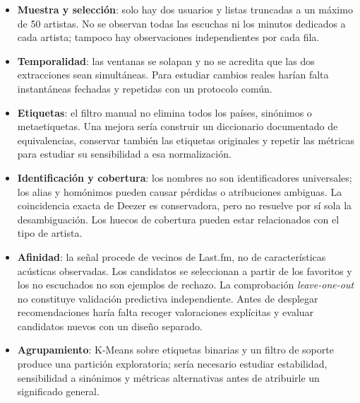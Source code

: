 \begin{itemize}
    \item \textbf{Muestra y selección}: solo hay dos usuarios y listas truncadas a un máximo de 50 artistas. No se observan todas las escuchas ni los minutos dedicados a cada artista; tampoco hay observaciones independientes por cada fila.
    \item \textbf{Temporalidad}: las ventanas se solapan y no se acredita que las dos extracciones sean simultáneas. Para estudiar cambios reales harían falta instantáneas fechadas y repetidas con un protocolo común.
    \item \textbf{Etiquetas}: el filtro manual no elimina todos los países, sinónimos o metaetiquetas. Una mejora sería construir un diccionario documentado de equivalencias, conservar también las etiquetas originales y repetir las métricas para estudiar su sensibilidad a esa normalización.
    \item \textbf{Identificación y cobertura}: los nombres no son identificadores universales; los alias y homónimos pueden causar pérdidas o atribuciones ambiguas. La coincidencia exacta de Deezer es conservadora, pero no resuelve por sí sola la desambiguación. Los huecos de cobertura pueden estar relacionados con el tipo de artista.
    \item \textbf{Afinidad}: la señal procede de vecinos de Last.fm, no de características acústicas observadas. Los candidatos se seleccionan a partir de los favoritos y los no escuchados no son ejemplos de rechazo. La comprobación \emph{leave-one-out} no constituye validación predictiva independiente. Antes de desplegar recomendaciones haría falta recoger valoraciones explícitas y evaluar candidatos nuevos con un diseño separado.
    \item \textbf{Agrupamiento}: K-Means sobre etiquetas binarias y un filtro de soporte produce una partición exploratoria; sería necesario estudiar estabilidad, sensibilidad a sinónimos y métricas alternativas antes de atribuirle un significado general.
\end{itemize}
